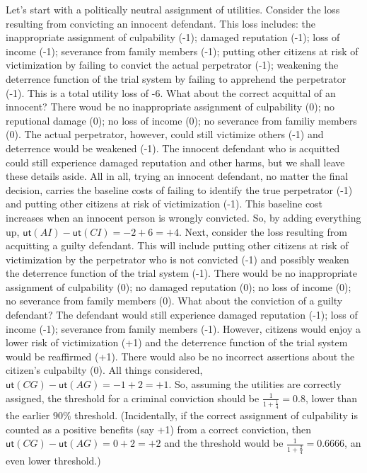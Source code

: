 \documentclass[10pt,dvipsnames,enabledeprecatedfontcommands]{scrartcl}
\newcommand{\ut}{\mathsf{ut}}
\begin{document}
Let's start with a politically neutral assignment of utilities. Consider
the loss resulting from convicting an innocent defendant. This loss
includes: the inappropriate assignment of culpability (-1); damaged
reputation (-1); loss of income (-1); severance from family members
(-1); putting other citizens at risk of victimization by failing to
convict the actual perpetrator (-1); weakening the deterrence function
of the trial system by failing to apprehend the perpetrator (-1). This
is a total utility loss of -6. What about the correct acquittal of an
innocent? There woud be no inappropriate assignment of culpability (0);
no reputional damage (0); no loss of income (0); no severance from
familiy members (0). The actual perpetrator, however, could still
victimize others (-1) and deterrence would be weakened (-1). The
innocent defendant who is acquitted could still experience damaged
reputation and other harms, but we shall leave these details aside. All
in all, trying an innocent defendant, no matter the final decision,
carries the baseline costs of failing to identify the true perpetrator
(-1) and putting other citizens at risk of victimization (-1). This
baseline cost increases when an innocent person is wrongly convicted.
So, by adding everything up, \(\ut(AI)-\ut(CI)=-2+6=+4\). Next, consider
the loss resulting from acquitting a guilty defendant. This will include
putting other citizens at risk of victimization by the perpetrator who
is not convicted (-1) and possibly weaken the deterrence function of the
trial system (-1). There would be no inappropriate assignment of
culpability (0); no damaged reputation (0); no loss of income (0); no
severance from family members (0). What about the conviction of a guilty
defendant? The defendant would still experience damaged reputation (-1);
loss of income (-1); severance from family members (-1). However,
citizens would enjoy a lower risk of victimization (+1) and the
deterrence function of the trial system would be reaffirmed (+1). There
would also be no incorrect assertions about the citizen's culpabilty
(0). All things considered, \(\ut(CG)-\ut(AG)=-1+2=+1\). So, assuming
the utilities are correctly assigned, the threshold for a criminal
conviction should be \(\frac{1}{1+\frac{1}{4}}=0.8\), lower than the
earlier \(90\%\) threshold. (Incidentally, if the correct assignment of
culpability is counted as a positive benefits (say +1) from a correct
conviction, then \(\ut(CG)-\ut(AG)=0+2=+2\) and the threshold would be
\(\frac{1}{1+\frac{2}{4}}=0.6666\), an even lower threshold.)
\end{document}
